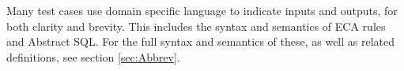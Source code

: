 \documentclass[12pt]{report}
\begin{document}
\newcommand{\systemTest}[5]{
\section*{T\arabic{sysTestNum}~~~ #2}\label{sec:#1}
\addcontentsline{toc}{section}{T\arabic{sysTestNum}~~~ #2}
\stepcounter{sysTestNum}
\hspace{-6pt}\begin{tabular}{p{3cm}l}
\textbf{Test type}     &   #3 \\ 
\textbf{Schedule}      &   #4 \\
\textbf{Requirements}  &   #5 \\
\end{tabular}
}


Many test cases use domain specific language to indicate inputs and outputs, for
both clarity and brevity. This includes the syntax and semantics of ECA rules
and Abstract SQL. For the full syntax and semantics of these, as well as
related definitions, see section \ref{sec:Abbrev}.






\end{document}
